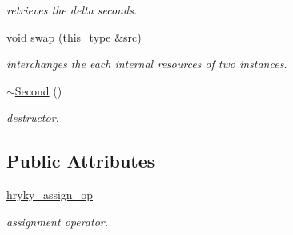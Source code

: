 \begin{DoxyCompactItemize}
\begin{DoxyCompactList}\small\item\em retrieves the delta seconds. \end{DoxyCompactList}\item 
\hypertarget{classhryky_1_1http_1_1header_1_1cache_1_1directive_1_1_second_ae864a048f5c6849e7326dd8e0d8257f8}{void \hyperlink{classhryky_1_1http_1_1header_1_1cache_1_1directive_1_1_second_ae864a048f5c6849e7326dd8e0d8257f8}{swap} (\hyperlink{classhryky_1_1http_1_1header_1_1cache_1_1directive_1_1_second_a767aa9878f09e259c520df7c27a4d608}{this\-\_\-type} \&src)}\label{classhryky_1_1http_1_1header_1_1cache_1_1directive_1_1_second_ae864a048f5c6849e7326dd8e0d8257f8}

\begin{DoxyCompactList}\small\item\em interchanges the each internal resources of two instances. \end{DoxyCompactList}\item 
\hypertarget{classhryky_1_1http_1_1header_1_1cache_1_1directive_1_1_second_a1ca2d403a3ac722e280aa793f82e9851}{\hyperlink{classhryky_1_1http_1_1header_1_1cache_1_1directive_1_1_second_a1ca2d403a3ac722e280aa793f82e9851}{$\sim$\-Second} ()}\label{classhryky_1_1http_1_1header_1_1cache_1_1directive_1_1_second_a1ca2d403a3ac722e280aa793f82e9851}

\begin{DoxyCompactList}\small\item\em destructor. \end{DoxyCompactList}\end{DoxyCompactItemize}
\subsection*{Public Attributes}
\begin{DoxyCompactItemize}
\item 
\hypertarget{classhryky_1_1http_1_1header_1_1cache_1_1directive_1_1_second_a2662dae9ad5567e3da168e8579c50ba2}{\hyperlink{classhryky_1_1http_1_1header_1_1cache_1_1directive_1_1_second_a2662dae9ad5567e3da168e8579c50ba2}{hryky\-\_\-assign\-\_\-op}}\label{classhryky_1_1http_1_1header_1_1cache_1_1directive_1_1_second_a2662dae9ad5567e3da168e8579c50ba2}

\begin{DoxyCompactList}\small\item\em assignment operator. \end{DoxyCompactList}\end{DoxyCompactItemize}


